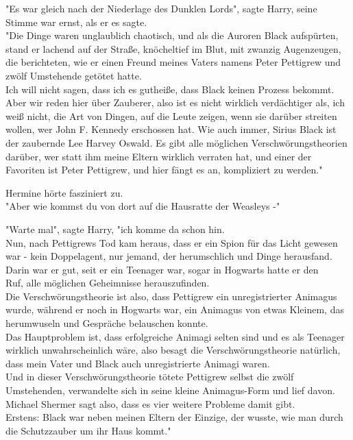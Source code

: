 {"Es war gleich nach der Niederlage des Dunklen Lords", sagte Harry, seine Stimme war ernst, als er es sagte.\\ "Die Dinge waren unglaublich chaotisch, und als die Auroren Black aufspürten, stand er lachend auf der Straße, knöcheltief im Blut, mit zwanzig Augenzeugen, die berichteten, wie er einen Freund meines Vaters namens Peter Pettigrew und zwölf Umstehende getötet hatte.\\ Ich will nicht sagen, dass ich es gutheiße, dass Black keinen Prozess bekommt. Aber wir reden hier über Zauberer, also ist es nicht wirklich verdächtiger als, ich weiß nicht, die Art von Dingen, auf die Leute zeigen, wenn sie darüber streiten wollen, wer John F. Kennedy erschossen hat. Wie auch immer, Sirius Black ist der zaubernde Lee Harvey Oswald. Es gibt alle möglichen Verschwörungstheorien darüber, wer statt ihm meine Eltern wirklich verraten hat, und einer der Favoriten ist Peter Pettigrew, und hier fängt es an, kompliziert zu werden."

Hermine hörte fasziniert zu.\\ "Aber wie kommst du von dort auf die Hausratte der Weasleys -"

"Warte mal", sagte Harry, "ich komme da schon hin.\\ Nun, nach Pettigrews Tod kam heraus, dass er ein Spion für das Licht gewesen war - kein Doppelagent, nur jemand, der herumschlich und Dinge herausfand.\\ Darin war er gut, seit er ein Teenager war, sogar in Hogwarts hatte er den\\ Ruf, alle möglichen Geheimnisse herauszufinden.\\ Die Verschwörungstheorie ist also, dass Pettigrew ein unregistrierter Animagus wurde, während er noch in Hogwarts war, ein Animagus von etwas Kleinem, das herumwuseln und Gespräche belauschen konnte.\\ Das Hauptproblem ist, dass erfolgreiche Animagi selten sind und es als Teenager wirklich unwahrscheinlich wäre, also besagt die Verschwörungstheorie natürlich, dass mein Vater und Black auch unregistrierte Animagi waren.\\ Und in dieser Verschwörungstheorie tötete Pettigrew selbst die zwölf Umstehenden, verwandelte sich in seine kleine Animagus-Form und lief davon.\\ Michael Shermer sagt also, dass es vier weitere Probleme damit gibt.\\ Erstens: Black war neben meinen Eltern der Einzige, der wusste, wie man durch die Schutzzauber um ihr Haus kommt."

}
